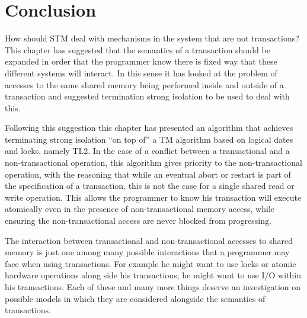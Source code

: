 \section{Conclusion}
\label{sec:conclusions}
How should STM deal with mechanisms in the system that are not transactions?
This chapter has suggested that the semantics of a transaction should be
expanded in order that the programmer know there is fixed way that
these different systems will interact.
In this sense it has looked at the problem of accesses to the same
shared memory being performed inside and outside of a transaction
and suggested termination strong isolation to be used to deal with this.

Following this suggestion this chapter has presented an algorithm that achieves terminating strong 
isolation  ``on top of'' a TM algorithm based on logical dates and locks, 
namely  TL2. 
In the case of a conflict between a transactional and a non-transactional
operation, this algorithm gives priority to 
the non-transactional operation, 
with the reasoning that while an eventual abort or restart is part of the 
specification of a transaction,
this is not the case for a single shared read or write operation. 
This allows the programmer to know his transaction will execute atomically even
in the presence of non-transactional memory access, while ensuring the non-transactional
access are never blocked from progressing.

The interaction between transactional and non-transactional accesses to shared memory
is just one among many possible interactions that a programmer may face when using
transactions.
For example he might want to use locks or atomic hardware operations along side his transactions,
he might want to use I/O within his transactions.
Each of these and many more things deserve an investigation on possible models in which
they are considered alongside the semantics of transactions.









% 
% 